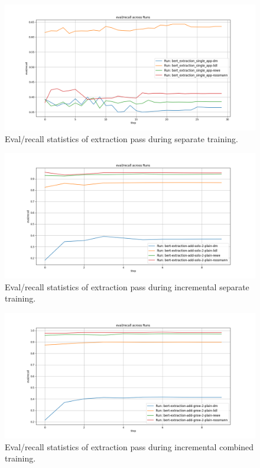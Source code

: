 \documentclass[licencjacka,en]{pracamgr}
\begin{document}
\begin{figure}[htbp]
    \centering
    \includegraphics[width=0.8\linewidth]{bachelor_images/bert_ft/e_ers.png}
    \caption{Eval/recall statistics of extraction pass during separate training.}
    \label{fig:e_ers}
\end{figure}

\begin{figure}[htbp]
    \centering
    \includegraphics[width=0.8\linewidth]{bachelor_images/bert_ft/e_eras.png}
    \caption{Eval/recall statistics of extraction pass during incremental separate training.}
    \label{fig:e_eras}
\end{figure}

\begin{figure}[htbp]
    \centering
    \includegraphics[width=0.8\linewidth]{bachelor_images/bert_ft/e_erag.png}
    \caption{Eval/recall statistics of extraction pass during incremental combined training.}
    \label{fig:e_erag}
\end{figure}
\end{document}
